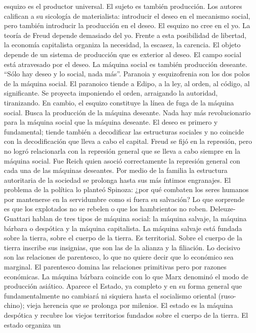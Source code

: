 \documentclass[
]{article}
\begin{document}
esquizo es el productor universal. El sujeto es también producción. Los
autores califican a su sicología de materialista: introducir el deseo en
el mecanismo social, pero también introducir la producción en el deseo.
El esquizo no cree en el yo. La teoría de Freud depende demasiado del
yo. Frente a esta posibilidad de libertad, la economía capitalista
organiza la necesidad, la escasez, la carencia. El objeto depende de un
sistema de producción que es exterior al deseo. El campo social está
atravesado por el deseo. La máquina social es también producción
deseante. ``Sólo hay deseo y lo social, nada más''. Paranoia y
esquizofrenia son los dos polos de la máquina social. El paranoico
tiende a Edipo, a la ley, al orden, al código, al significante. Se
proyecta imponiendo el orden, arraigando la autoridad, tiranizando. En
cambio, el esquizo constituye la línea de fuga de la máquina social.
Busca la producción de la máquina deseante. Nada hay más revolucionario
para la máquina social que la máquina deseante. El deseo es primero y
fundamental; tiende también a decodificar las estructuras sociales y no
coincide con la decodificación que lleva a cabo el capital. Freud se
fijó en la represión, pero no logró relacionarla con la represión
general que se lleva a cabo siempre en la máquina social. Fue Reich
quien asoció correctamente la represión general con cada una de las
máquinas deseantes. Por medio de la familia la estructura autoritaria de
la sociedad se prolonga hasta sus más íntimos engranajes. El problema de
la política lo planteó Spinoza: ¿por qué combaten los seres humanos por
mantenerse en la servidumbre como si fuera su salvación? Lo que
sorprende es que los explotados no se rebelen o que los hambrientos no
roben. Deleuze-Guattari hablan de tres tipos de máquina social: la
máquina salvaje, la máquina bárbara o despótica y la máquina
capitalista. La máquina salvaje está fundada sobre la tierra, sobre el
cuerpo de la tierra. Es territorial. Sobre el cuerpo de la tierra
inscribe sus insignias, que son las de la alianza y la filiación. Lo
decisivo son las relaciones de parentesco, lo que no quiere decir que lo
económico sea marginal. El parentesco domina las relaciones primitivas
pero por razones económicas. La máquina bárbara coincide con lo que Marx
denominó el modo de producción asiático. Aparece el Estado, ya completo
y en su forma general que fundamentalmente no cambiará ni siquiera hasta
el socialismo oriental (ruso-chino); vieja herencia que se prolonga por
milenios. El estado es la máquina despótica y recubre los viejos
territorios fundados sobre el cuerpo de la tierra. El estado organiza un
\end{document}
